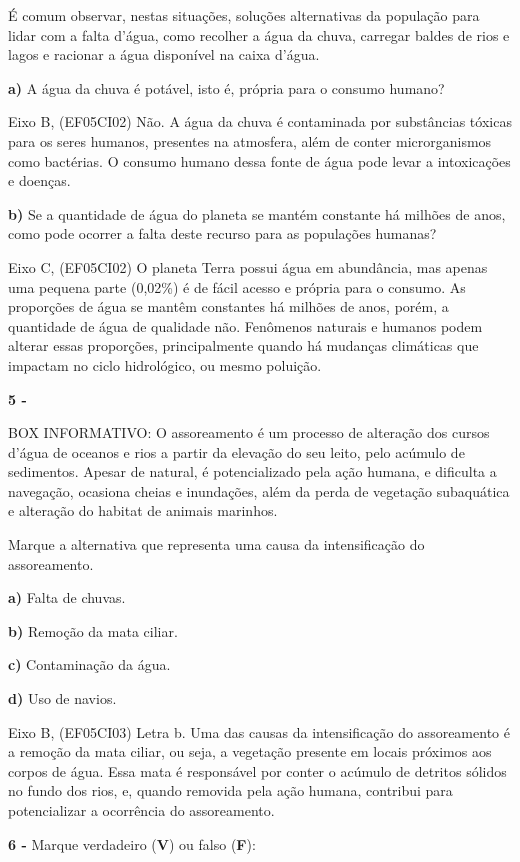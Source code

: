 É comum observar, nestas situações, soluções alternativas da população
para lidar com a falta d'água, como recolher a água da chuva, carregar
baldes de rios e lagos e racionar a água disponível na caixa d'água.

\textbf{a)} A água da chuva é potável, isto é, própria para o consumo
humano?

Eixo B, (EF05CI02) Não. A água da chuva é contaminada por substâncias
tóxicas para os seres humanos, presentes na atmosfera, além de conter
microrganismos como bactérias. O consumo humano dessa fonte de água pode
levar a intoxicações e doenças.

\textbf{b)} Se a quantidade de água do planeta se mantém constante há
milhões de anos, como pode ocorrer a falta deste recurso para as
populações humanas?

Eixo C, (EF05CI02) O planeta Terra possui água em abundância, mas apenas
uma pequena parte (0,02\%) é de fácil acesso e própria para o consumo.
As proporções de água se mantêm constantes há milhões de anos, porém, a
quantidade de água de qualidade não. Fenômenos naturais e humanos podem
alterar essas proporções, principalmente quando há mudanças climáticas
que impactam no ciclo hidrológico, ou mesmo poluição.

\textbf{5 - }

BOX INFORMATIVO: O assoreamento é um processo de alteração dos cursos
d'água de oceanos e rios a partir da elevação do seu leito, pelo acúmulo
de sedimentos. Apesar de natural, é potencializado pela ação humana, e
dificulta a navegação, ocasiona cheias e inundações, além da perda de
vegetação subaquática e alteração do habitat de animais marinhos.

Marque a alternativa que representa uma causa da intensificação do
assoreamento.

\textbf{a)} Falta de chuvas.

\textbf{b)} Remoção da mata ciliar.

\textbf{c)} Contaminação da água.

\textbf{d)} Uso de navios.

Eixo B, (EF05CI03) Letra b. Uma das causas da intensificação do
assoreamento é a remoção da mata ciliar, ou seja, a vegetação presente
em locais próximos aos corpos de água. Essa mata é responsável por
conter o acúmulo de detritos sólidos no fundo dos rios, e, quando
removida pela ação humana, contribui para potencializar a ocorrência do
assoreamento.

\textbf{6 -} Marque verdadeiro (\textbf{V}) ou falso (\textbf{F}):

